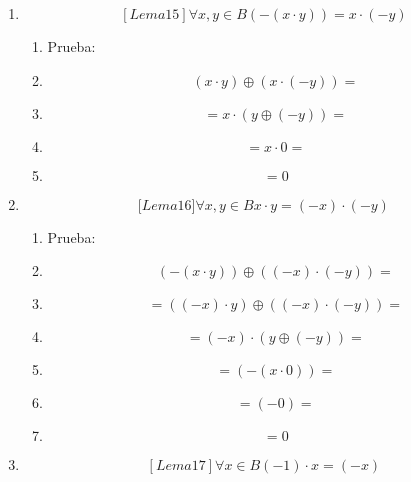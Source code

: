 \begin{enumerate}
\begin{enumerate}
\begin{enumerate}
\begin{enumerate}
        \begin{enumerate}
        \def\labelenumv{\arabic{enumv}.}
        \tightlist
        \item
          Prueba:
        \item
          \[\left( {x \cdot y} \right) \oplus {\left( {\left( {- x} \right) \cdot y} \right) =}\]
        \item
          \[{\left( {(x) \oplus \left( {- x} \right)} \right) \cdot y} =\]
        \item
          \[{= {0 \cdot y}} =\]
        \item
          \[= 0\]
        \end{enumerate}
      \item
        \[\left\lbrack {{Lema}15} \right\rbrack\forall x,{y \in B}{\left( {- \left( {x \cdot y} \right)} \right) = {x \cdot \left( {- y} \right)}}\]

        \begin{enumerate}
        \def\labelenumv{\arabic{enumv}.}
        \tightlist
        \item
          Prueba:
        \item
          \[\left( {x \cdot y} \right) \oplus {\left( {x \cdot \left( {- y} \right)} \right) =}\]
        \item
          \[{= {x \cdot \left( {y \oplus \left( {- y} \right)} \right)}} =\]
        \item
          \[{= {x \cdot 0}} =\]
        \item
          \[= 0\]
        \end{enumerate}
      \item
        \[{\lbrack{{Lema}16}\rbrack}\forall x,{y \in B}{{x \cdot y} = {\left( {- x} \right) \cdot \left( {- y} \right)}}\]

        \begin{enumerate}
        \def\labelenumv{\arabic{enumv}.}
        \tightlist
        \item
          Prueba:
        \item
          \[\left( {- \left( {x \cdot y} \right)} \right) \oplus {\left( {\left( {- x} \right) \cdot \left( {- y} \right)} \right) =}\]
        \item
          \[{= \left( {\left( {- x} \right) \cdot y} \right)} \oplus {\left( {\left( {- x} \right) \cdot \left( {- y} \right)} \right) =}\]
        \item
          \[{= {\left( {- x} \right) \cdot \left( {y \oplus \left( {- y} \right)} \right)}} =\]
        \item
          \[{= \left( {- \left( {x \cdot 0} \right)} \right)} =\]
        \item
          \[{= \left( {- 0} \right)} =\]
        \item
          \[= 0\]
        \end{enumerate}
      \item
        \[\left\lbrack {{Lema}17} \right\rbrack\forall{x \in B}{{\left( {- 1} \right) \cdot x} = \left( {- x} \right)}\]


\end{enumerate}
\end{enumerate}
\end{enumerate}
\end{enumerate}
